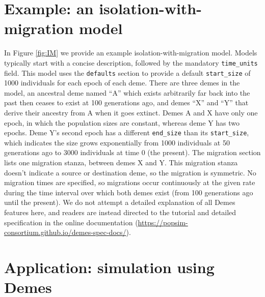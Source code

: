 \documentclass[11pt]{article}
\begin{document}
\section*{Example: an isolation-with-migration model}
In Figure \ref{fig:IM} we provide an example isolation-with-migration model.
Models typically start with a concise description, followed by the mandatory
\texttt{time\_units} field.
This model uses the \texttt{defaults} section to provide a default \texttt{start\_size}
of 1000 individuals for each epoch of each deme.
There are three demes in the model, an ancestral deme named ``A'' which exists
arbitrarily far back into the past then ceases to exist at 100 generations ago,
and demes ``X'' and ``Y'' that derive their
ancestry from A when it goes extinct.
Demes A and X have only one epoch, in which the population sizes are
constant, whereas deme Y has two epochs. Deme Y's second epoch has a different
\texttt{end\_size} than its \texttt{start\_size}, which indicates the size
grows exponentially from 1000 individuals at 50 generations ago to 3000
individuals at time 0 (the present).
The migration section lists one migration stanza, between demes X and Y.
This migration stanza doesn't indicate a source or destination deme,
so the migration is symmetric. No migration times are specified, so migrations
occur continuously at the given rate during the time interval over which
both demes exist (from 100 generations ago until the present).
We do not attempt a detailed explanation of all Demes features here,
and readers are instead directed to the tutorial and detailed specification
in the online documentation
(\url{https://popsim-consortium.github.io/demes-spec-docs/}).

\section*{Application: simulation using Demes}
\end{document}

